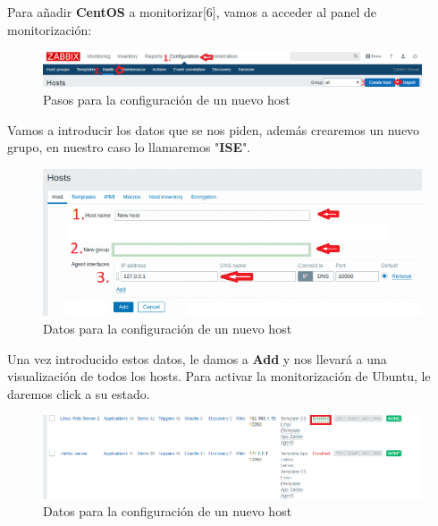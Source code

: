\documentclass[12pt,a4paper]{article}
\begin{document}
		Para añadir \textbf{CentOS} a monitorizar[6], vamos a acceder al panel de monitorización:
		
		\begin{figure}[h]
			\centering
			\includegraphics[width=1.0\textwidth]{images/host.png}
			\caption{Pasos para la configuración de un nuevo host}
		\end{figure}
		Vamos a introducir los datos que se nos piden, además crearemos un nuevo grupo, en nuestro caso lo llamaremos "\textbf{ISE}".
		\newline
		\begin{figure}[h]
			\centering
			\includegraphics[width=1.0\textwidth]{images/newhost.png}
			\caption{Datos para la configuración de un nuevo host}
		\end{figure}
		\newline
		Una vez introducido estos datos, le damos a \textbf{Add} y nos llevará a una visualización de todos los hosts.
		\newline
		\newline
		Para activar la monitorización de Ubuntu, le daremos click a su estado.
		\newline
		\begin{figure}[h]
			\centering
			\includegraphics[width=1.0\textwidth]{images/acthost.png}
			\caption{Datos para la configuración de un nuevo host}
		\end{figure}
	\newpage
\end{document}
